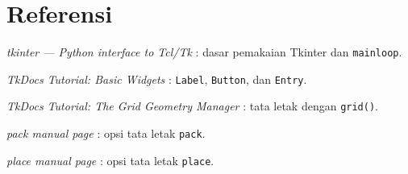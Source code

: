 \section*{Referensi}
\begin{daftarrapat}
  \item \textit{tkinter — Python interface to Tcl/Tk} \cite{py-tkinter}: dasar pemakaian Tkinter dan \texttt{mainloop}.
  \item \textit{TkDocs Tutorial: Basic Widgets} \cite{tkdocs-widgets}: \texttt{Label}, \texttt{Button}, dan \texttt{Entry}.
  \item \textit{TkDocs Tutorial: The Grid Geometry Manager} \cite{tkdocs-grid}: tata letak dengan \texttt{grid()}.
  \item \textit{pack manual page} \cite{tk-pack}: opsi tata letak \texttt{pack}.
  \item \textit{place manual page} \cite{tk-place}: opsi tata letak \texttt{place}.
\end{daftarrapat}
